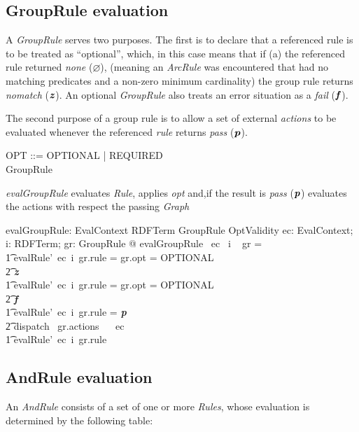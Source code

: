 \documentclass[fuzz]{llncs}
\def\pass{\textbf{\textit{p}}}
\def\fail{\textbf{\textit{f}}}
\def\none{\varnothing}
\def\error{\varepsilon}
\def\nomatch{\textbf{\textit{z}}}
\def\zc{\textit}
\begin{document}
\subsection{GroupRule evaluation}
A \zc{GroupRule} serves two purposes.  The first is to declare that a referenced rule is to be
treated as ``optional'', which, in this case means that if (a) the referenced rule returned
\zc{none} ($\none$), (meaning an \zc{ArcRule} was encountered that had no matching
predicates and a non-zero minimum cardinality) the group rule returns \zc{nomatch} 
($\nomatch$).  An optional \zc{GroupRule} also treats an error situation as a \zc{fail} 
($\fail$).

The second purpose of a group rule is to allow a set of external \zc{actions} to be evaluated
whenever the referenced \zc{rule} returns \zc{pass} ($\pass$). 


\begin{zed}
OPT ::= OPTIONAL | REQUIRED \\
GroupRule  \\
\end{zed}
\zc{evalGroupRule} evaluates \zc{Rule}, applies \zc{opt} and,if the result is \zc{pass} ($\pass$) evaluates the actions with respect the passing \zc{Graph} 
\begin{gendef}
   evalGroupRule: EvalContext \fun RDFTerm \fun GroupRule \fun OptValidity
\where
   \forall ec: EvalContext; i: RDFTerm; gr: GroupRule @ evalGroupRule~ ec~ i ~ gr = \\
\t1 \IF evalRule'~ec~i~gr.rule = \none \land gr.opt = OPTIONAL \\
\t2 \THEN \nomatch \\
\t1 \ELSE \IF evalRule'~ec~i~gr.rule = \error \land gr.opt = OPTIONAL \\
\t2 \THEN \fail \\
\t1 \ELSE \IF evalRule'~ec~i~gr.rule = \pass \\
\t2 \THEN dispatch~ gr.actions~ \emptyset ~ ec \\
\t1 \ELSE evalRule'~ec~i~gr.rule
\end{gendef}

\subsection{AndRule evaluation}
An \zc{AndRule} consists of a set of one or more \zc{Rules}, whose evaluation is determined
by the following table: \\
\end{document}
